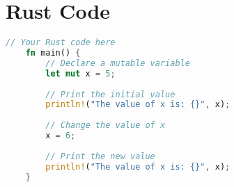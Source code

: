 \newpage

\section{Rust Code}

\begin{lstlisting}[language=Rust,
	style=mystyle,
	caption={An example of Rust code.},
	label={example-rust}]
	// Your Rust code here
	fn main() {
		// Declare a mutable variable
		let mut x = 5; 
		
		// Print the initial value
		println!("The value of x is: {}", x); 
		
		// Change the value of x
		x = 6; 
		
		// Print the new value
		println!("The value of x is: {}", x); 
	}
\end{lstlisting}
